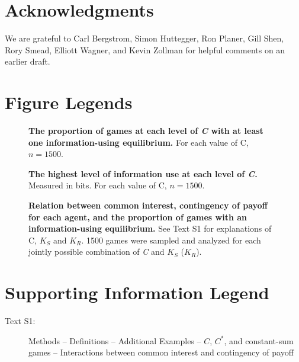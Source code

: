 \documentclass[10pt]{article}
\begin{document}
\section*{Acknowledgments}

We are grateful to Carl Bergstrom, Simon Huttegger, Ron Planer, Gill
Shen, Rory Smead, Elliott Wagner, and Kevin Zollman for helpful comments
on an earlier draft.



\pagebreak
\section*{Figure Legends}
\begin{figure}[!ht]
\begin{center}
\end{center}
\caption{
{\bf The proportion of games at each level of \emph{C} with
at least one information-using equilibrium.} For each value of C,
$n=1500$.}
\label{Figure_label}
\end{figure}

\begin{figure}[!ht]
\begin{center}
\end{center}
\caption{
{\bf The highest level of information use at each level of \emph{C}.} Measured in bits. For each value of C, $n=1500$.}
\label{Figure_label}
\end{figure}

\begin{figure}[!ht]
\begin{center}
\end{center}
\caption{
    {\bf Relation between common interest,
contingency of payoff for each agent, and the proportion of games with
an information-using equilibrium.} See Text S1 for explanations of
C, $K_S$ and $K_R$. 1500 games were sampled and analyzed for each
jointly possible combination of \emph{C} and $K_S$ ($K_R$).}
\label{Figure_label}
\end{figure}
\pagebreak

\section*{Supporting Information Legend}
\begin{description}
    \item[Text S1:]Methods -- Definitions -- Additional Examples -- $C$, $C^*$, and constant-sum games -- Interactions between common interest and contingency of payoff
\end{description}
\end{document}
